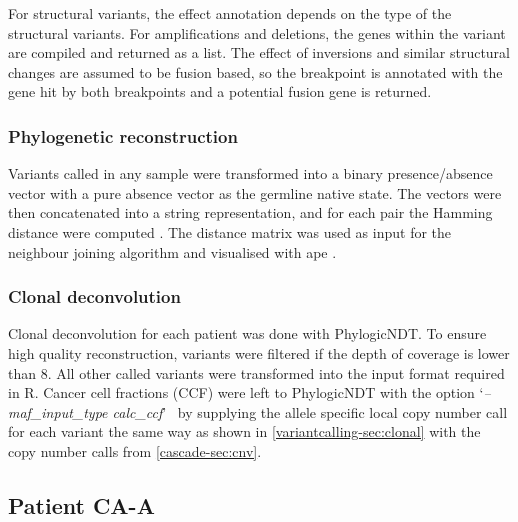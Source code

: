 For structural variants, the effect annotation depends on the type of the structural variants. For amplifications and deletions, the genes within the variant are compiled and returned as a list. The effect of inversions and similar structural changes are assumed to be fusion based, so the breakpoint is annotated with the gene hit by both breakpoints and a potential fusion gene is returned.


\subsubsection{Phylogenetic reconstruction}
\label{cascade-sec:phylo}
Variants called in any sample were transformed into a binary presence/absence vector with a pure absence vector as the germline native state. The vectors were then concatenated into a string representation, and for each pair the Hamming distance were computed \cite{Hamming1950}. The distance matrix was used as input for the neighbour joining algorithm and visualised with ape \cite{Paradis2018}.


\subsubsection{Clonal deconvolution}
\label{cascade-sec:clonaldecon}

Clonal deconvolution for each patient was done with PhylogicNDT. To ensure high quality reconstruction, variants were filtered if the depth of coverage is lower than 8. All other called variants were transformed into the input format required in R. Cancer cell fractions (CCF) were left to PhylogicNDT with the option \lq\emph{--maf\_input\_type calc\_ccf}\rq~ by supplying the allele specific local copy number call for each variant the same way as shown in \autoref{variantcalling-sec:clonal} with the copy number calls from \autoref{cascade-sec:cnv}.



\cleardoublepage

\subsection{Patient CA-A}
\label{cascade-sec:CA99}

